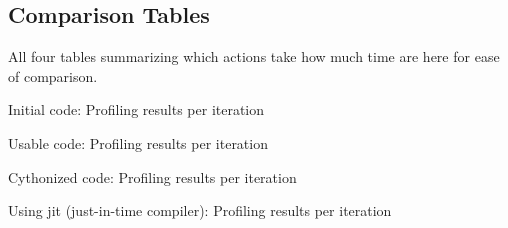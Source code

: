 \subsection{Comparison Tables}
All four tables summarizing which actions take how much time are here for ease of comparison.

\begin{table}[!ht]
  \centering
  
  \caption{Initial code: Profiling results per iteration}
  \label{tab:naive}
\end{table}

\begin{table}[!ht]
  \centering
  
  \caption{Usable code: Profiling results per iteration}
  \label{tab:usable}
\end{table}

\begin{table}[!ht]
  \centering
  
  \caption{Cythonized code: Profiling results per iteration}
  \label{tab:cythonized}
\end{table}

\begin{table}[!ht]
  \centering
  
  \caption{Using jit (just-in-time compiler): Profiling results per iteration}
  \label{tab:jit}
\end{table}
